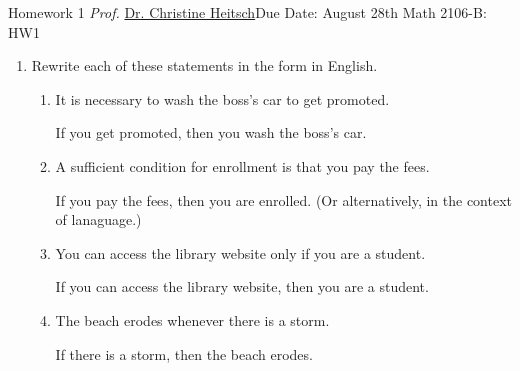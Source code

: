 \newpage{}
{Homework 1}
{\textit{Prof.} \href{https://ceheitsch.github.io/webpage/}{Dr. Christine Heitsch}}{Due Date: August 28th}
{Math 2106-B: HW1}

\newpage
\newpage








\begin{enumerate} 
  \item Rewrite each of these statements in the form 
  in English.
  \begin{enumerate}
    \item It is necessary to wash the boss's car to get promoted.
    \begin{subanswer}
      If you get promoted, then you wash the boss's car.
    \end{subanswer}
    \item A sufficient condition for enrollment is that you pay the fees.
    \begin{subanswer}
      If you pay the fees, then you are enrolled. (Or alternatively,  in the context of lanaguage.)
    \end{subanswer}
    \item You can access the library website only if you are a student.
    \begin{subanswer}
      If you can access the library website, then you are a student.
    \end{subanswer}
    \item The beach erodes whenever there is a storm.
    \begin{subanswer}
      If there is a storm, then the beach erodes.
    \end{subanswer}
  \end{enumerate}

  \newpage



\end{enumerate}
